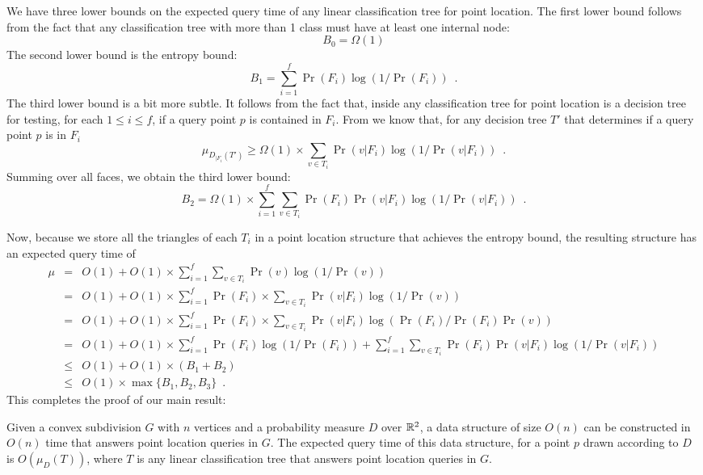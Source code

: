 \documentclass[charterfonts,lotsofwhite]{patmorin}
\begin{document}
We have three lower bounds on the expected query time of any linear
classification tree for point location.  The first lower bound follows
from the fact that any classification tree with more than 1 class must
have at least one internal node:
\[
    B_0 = \Omega(1)
\]
The second lower bound is the
entropy bound:
\[
	B_1 = \sum_{i=1}^f \Pr(F_i)\log(1/\Pr(F_i)) \enspace .
\]
The third lower bound is a bit more subtle.  It follows from the fact
that, inside any classification tree for point location is a decision
tree for testing, for each $1\le i\le f$, if a query point $p$ is
contained in $F_i$.  From  we know that, for any
decision tree $T'$ that determines if a query point $p$ is in $F_i$
\[
   \mu_{D_{|F_i}(T')} \ge \Omega(1)\times \sum_{v\in T_i}\Pr(v|F_i)\log(1/\Pr(v|F_i))
	\enspace .
\]
Summing over all faces, we obtain the third lower bound:
\[
   B_2 = \Omega(1)\times \sum_{i=1}^f \sum_{v\in T_i}\Pr(F_i)\Pr(v|F_i)\log(1/\Pr(v|F_i))
	\enspace .
\]

Now, because we store all the triangles of each $T_i$ in a point
location structure that achieves the entropy bound, the resulting
structure has an expected query time of 
\begin{eqnarray*}
\mu & = & O(1)+O(1)\times \sum_{i=1}^f \sum_{v\in T_i} \Pr(v)\log(1/\Pr(v)) \\
& = & O(1)+O(1)\times\sum_{i=1}^f \Pr(F_i)\times \sum_{v\in T_i} \Pr(v|F_{i})\log(1/\Pr(v)) \\
& = & O(1)+O(1)\times\sum_{i=1}^f \Pr(F_i)\times \sum_{v\in T_i}
	\Pr(v|F_{i})\log(\Pr(F_i)/\Pr(F_i)\Pr(v)) \\
& = & O(1)+O(1)\times\sum_{i=1}^f \Pr(F_i)\log (1/\Pr(F_i)) + 
        \sum_{i=1}^f \sum_{v\in T_i}
	\Pr(F_i)\Pr(v|F_{i})\log(1/\Pr(v|F_i)) \\
& \le & O(1)+O(1)\times(B_1 + B_2) \\
& \le & O(1)\times \max\{B_1, B_2,B_3\} \enspace .
\end{eqnarray*}
This completes the proof of our main result:

\begin{thm}
Given a convex subdivision $G$ with $n$ vertices and a probability measure
$D$ over $\mathbb{R}^2$, a data structure of size
$O(n)$ can be constructed in $O(n)$ time that answers point location queries in 
$G$. 
The expected query time of this data structure, for a point $p$
drawn according to $D$ is $O(\mu_D(T))$, where $T$ is any linear
classification tree that answers point location queries in $G$.
\end{thm}
\end{document}
